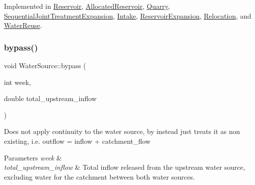 Implemented in \mbox{\hyperlink{classReservoir_a66929c055193785bc9d47bcdf0bc7445_a66929c055193785bc9d47bcdf0bc7445}{Reservoir}}, \mbox{\hyperlink{classAllocatedReservoir_aa5a3683ac3a1e7a778627332c6a7fff7_aa5a3683ac3a1e7a778627332c6a7fff7}{Allocated\+Reservoir}}, \mbox{\hyperlink{classQuarry_a6999b854a740ce92baaa610cf5b08bd9_a6999b854a740ce92baaa610cf5b08bd9}{Quarry}}, \mbox{\hyperlink{classSequentialJointTreatmentExpansion_a64fdd68fc68f6b1145291575c2116815_a64fdd68fc68f6b1145291575c2116815}{Sequential\+Joint\+Treatment\+Expansion}}, \mbox{\hyperlink{classIntake_acd5ab74c4091b286e69ecdcc495d83ce_acd5ab74c4091b286e69ecdcc495d83ce}{Intake}}, \mbox{\hyperlink{classReservoirExpansion_a18614050354dced5cc2747eeda0c2397_a18614050354dced5cc2747eeda0c2397}{Reservoir\+Expansion}}, \mbox{\hyperlink{classRelocation_af5c795c7b331b86b31c8bfa2ef9b6fe5_af5c795c7b331b86b31c8bfa2ef9b6fe5}{Relocation}}, and \mbox{\hyperlink{classWaterReuse_ab8ffb10c69790047a3a5dda66cfaf3ee_ab8ffb10c69790047a3a5dda66cfaf3ee}{Water\+Reuse}}.

\mbox{\label{classWaterSource_abeb8ba4b51c2b270baf9162df76d8b58_abeb8ba4b51c2b270baf9162df76d8b58}} 
\subsubsection{\texorpdfstring{bypass()}{bypass()}}
{\footnotesize\ttfamily void Water\+Source\+::bypass (\begin{DoxyParamCaption}\item[{int}]{week,  }\item[{double}]{total\+\_\+upstream\+\_\+inflow }\end{DoxyParamCaption})\hspace{0.3cm}{\ttfamily [protected]}}

Does not apply continuity to the water source, by instead just treats it as non existing, i.\+e. outflow = inflow + catchment\+\_\+flow 
\begin{DoxyParams}{Parameters}
{\em week} & \\
\hline
{\em total\+\_\+upstream\+\_\+inflow} & Total inflow released from the upstream water source, excluding water for the catchment between both water sources. \\
\hline
\end{DoxyParams}
\mbox{\label{classWaterSource_a47bc2006a1ef6ea4429d56a24319940f_a47bc2006a1ef6ea4429d56a24319940f}} 
